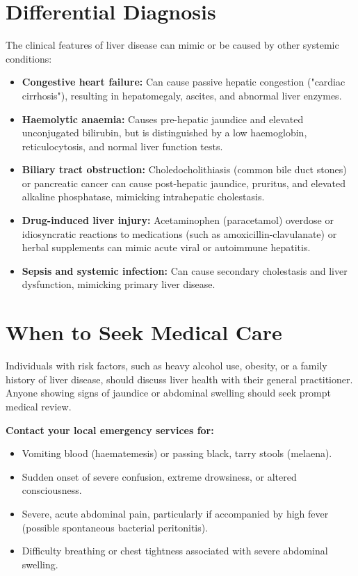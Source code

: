 \section*{Differential Diagnosis}
The clinical features of liver disease can mimic or be caused by other systemic conditions:
\begin{itemize}
    \item \textbf{Congestive heart failure:} Can cause passive hepatic congestion ("cardiac cirrhosis"), resulting in hepatomegaly, ascites, and abnormal liver enzymes.
    \item \textbf{Haemolytic anaemia:} Causes pre-hepatic jaundice and elevated unconjugated bilirubin, but is distinguished by a low haemoglobin, reticulocytosis, and normal liver function tests.
    \item \textbf{Biliary tract obstruction:} Choledocholithiasis (common bile duct stones) or pancreatic cancer can cause post-hepatic jaundice, pruritus, and elevated alkaline phosphatase, mimicking intrahepatic cholestasis.
    \item \textbf{Drug-induced liver injury:} Acetaminophen (paracetamol) overdose or idiosyncratic reactions to medications (such as amoxicillin-clavulanate) or herbal supplements can mimic acute viral or autoimmune hepatitis.
    \item \textbf{Sepsis and systemic infection:} Can cause secondary cholestasis and liver dysfunction, mimicking primary liver disease.
\end{itemize}

\section*{When to Seek Medical Care}
Individuals with risk factors, such as heavy alcohol use, obesity, or a family history of liver disease, should discuss liver health with their general practitioner. Anyone showing signs of jaundice or abdominal swelling should seek prompt medical review.

\textbf{Contact your local emergency services for:}
\begin{itemize}
    \item Vomiting blood (haematemesis) or passing black, tarry stools (melaena).
    \item Sudden onset of severe confusion, extreme drowsiness, or altered consciousness.
    \item Severe, acute abdominal pain, particularly if accompanied by high fever (possible spontaneous bacterial peritonitis).
    \item Difficulty breathing or chest tightness associated with severe abdominal swelling.
\end{itemize}


